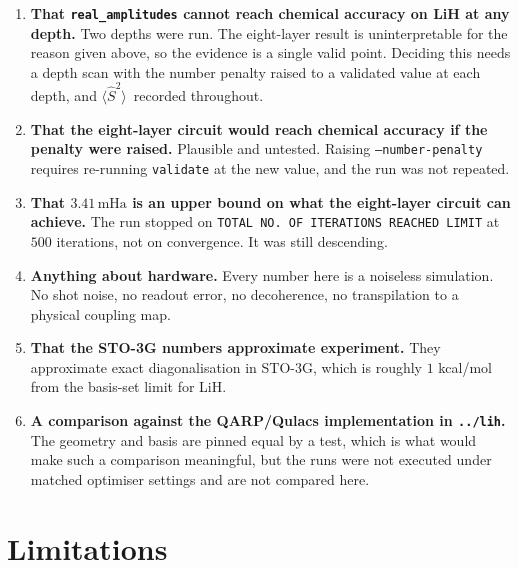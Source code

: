 \documentclass[11pt,a4paper]{article}
\newcommand{\mHa}{\ensuremath{\,\mathrm{mHa}}}
\newcommand{\Ssq}{\ensuremath{\langle \hat{S}^2 \rangle}}
\newcommand{\code}[1]{\texttt{\small #1}}
\begin{document}
\begin{enumerate}[leftmargin=1.4em,itemsep=0.3em]

\item \textbf{That \code{real\_amplitudes} cannot reach chemical accuracy on
  LiH at any depth.} Two depths were run. The eight-layer result is
  uninterpretable for the reason given above, so the evidence is a single valid
  point. Deciding this needs a depth scan with the number penalty raised to a
  validated value at each depth, and \Ssq\ recorded throughout.

\item \textbf{That the eight-layer circuit would reach chemical accuracy if the
  penalty were raised.} Plausible and untested. Raising \code{--number-penalty}
  requires re-running \code{validate} at the new value, and the run was not
  repeated.

\item \textbf{That $3.41\mHa$ is an upper bound on what the eight-layer circuit
  can achieve.} The run stopped on \code{TOTAL NO. OF ITERATIONS REACHED LIMIT}
  at $500$ iterations, not on convergence. It was still descending.

\item \textbf{Anything about hardware.} Every number here is a noiseless
  simulation. No shot noise, no readout error, no decoherence, no transpilation
  to a physical coupling map.

\item \textbf{That the STO-3G numbers approximate experiment.} They approximate
  exact diagonalisation in STO-3G, which is roughly $1$ kcal/mol from the
  basis-set limit for LiH.

\item \textbf{A comparison against the QARP/Qulacs implementation in
  \code{../lih}.} The geometry and basis are pinned equal by a test, which is
  what would make such a comparison meaningful, but the runs were not executed
  under matched optimiser settings and are not compared here.

\end{enumerate}

\section{Limitations}
\end{document}
